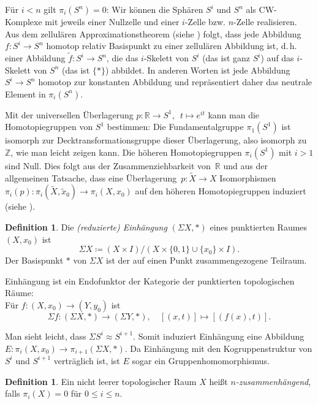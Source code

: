 \documentclass[11pt, a4paper, german]{article}
\theoremstyle{definition}
\newtheorem{defn}[lem]{Definition}
\theoremstyle{remark}
\newcommand{\TODO}[1]{\textcolor{red}{TODO: #1}} %
\newcommand{\R}{\mathbb{R}} %
\newcommand{\Z}{\mathbb{Z}} %
\newcommand{\homeo}{\approx} %
\renewcommand{\dh}{d.\,h.} %
\begin{document}

Für $i < n$ gilt $\pi_i(S^n) = 0$:
Wir können die Sphären $S^i$ und $S^n$ als CW-Komplexe mit jeweils einer Nullzelle und einer $i$-Zelle bzw. $n$-Zelle realisieren.
Aus dem zellulären Approximationstheorem (siehe \cite[\mbox{}Thm 4.8]{hatcher:at}) folgt, dass jede Abbildung $f : S^i \to S^n$ homotop relativ Basispunkt zu einer zellulären Abbildung ist, \dh{} einer Abbildung $\tilde{f} : S^i \to S^n$, die das $i$-Skelett von $S^i$ (das ist ganz $S^i$) auf das $i$-Skelett von $S^n$ (das ist $\{ * \}$) abbildet.
In anderen Worten ist jede Abbildung $S^i \to S^n$ homotop zur konstanten Abbildung und repräsentiert daher das neutrale Element in $\pi_i(S^n)$.

Mit der universellen Überlagerung $p : \R \to S^1, \enspace t \mapsto e^{it}$ kann man die Homotopiegruppen von $S^1$ bestimmen:
Die Fundamentalgruppe $\pi_1(S^1)$ ist isomorph zur Decktransformationsgruppe dieser Überlagerung, also isomorph zu~$\Z$, wie man leicht zeigen kann.
Die höheren Homotopiegruppen $\pi_i(S^1)$ mit $i > 1$ sind Null.
Dies folgt aus der Zusammenziehbarkeit von~$\R$ und aus der allgemeinen Tatsache, dass eine Überlagerung~$p : \widetilde{X} \to X$ Isomorphismen $\pi_i(p) : \pi_i(\widetilde{X}, \widetilde{x}_0) \to \pi_i(X, x_0)$ auf den höheren Homotopiegruppen induziert (siehe \cite[\mbox{}Prop 4.1]{hatcher:at}).

\begin{defn}
  Die \emph{(reduzierte) Einhängung} $(\Sigma X, *)$ eines punktierten Raumes $(X, x_0)$ ist
  \[ \Sigma X \coloneqq (X \times I) / (X \times \{ 0, 1 \} \cup \{ x_0 \} \times I). \]
  Der Basispunkt $*$ von $\Sigma X$ ist der auf einen Punkt zusammengezogene Teilraum.
\end{defn}

Einhängung ist ein Endofunktor der Kategorie der punktierten topologischen Räume: \\
Für $f : (X, x_0) \to (Y, y_0)$ ist
\[
  \Sigma f : (\Sigma X, *) \to (\Sigma Y, *), \quad
  [(x, t)] \mapsto [(f(x), t)].
\]

Man sieht leicht, dass $\Sigma S^i \homeo S^{i+1}$.
Somit induziert Einhängung eine Abbildung $E : \pi_i(X, x_0) \to \pi_{i+1}(\Sigma X, *)$.
Da Einhängung mit den Kogruppenstruktur von $S^i$ und $S^{i+1}$ verträglich ist, ist $E$ sogar ein Gruppenhomomorphismus.

\begin{defn}
  Ein nicht leerer topologischer Raum $X$ heißt \emph{$n$-zusammenhängend}, falls $\pi_i(X) = 0$ für $0 \leq i \leq n$.
\end{defn}
\end{document}
